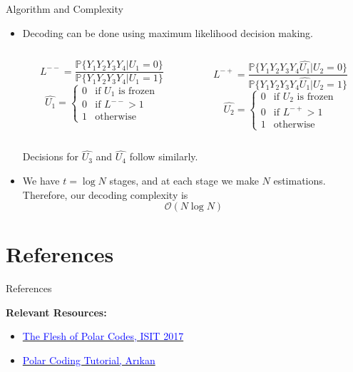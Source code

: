 \documentclass[8pt, compress]{beamer}
\begin{document}
\begin{frame}{Algorithm and Complexity}
    \begin{itemize}
        \item<1-> Decoding can be done using maximum likelihood decision making. \\
        \begin{columns}
            \begin{column}{0.5\linewidth}
            $$
            L^{--} = \frac{\mathbb{P}\{Y_1 Y_2 Y_3 Y_4 | U_1 = 0\}}{\mathbb{P}\{Y_1 Y_2 Y_3 Y_4 | U_1 = 1\}}
            $$
            $$
            \hat{U_1} = \begin{cases}
            0& \text{if } U_1 \text{ is frozen}\\
            0& \text{if } L^{--} > 1\\
            1& \text{otherwise}
            \end{cases}
            $$
            \end{column}
            \begin{column}{0.5\linewidth}
             $$
            L^{-+} = \frac{\mathbb{P}\{Y_1 Y_2 Y_3 Y_4 \hat{U_1}| U_2 = 0\}}{\mathbb{P}\{Y_1 Y_2 Y_3 Y_4 \hat{U_1}| U_2 = 1\}}
            $$
            $$
            \hat{U_2} = \begin{cases}
            0& \text{if } U_2 \text{ is frozen}\\
            0& \text{if } L^{-+} > 1\\
            1& \text{otherwise}
            \end{cases}
            $$
            \end{column}
        \end{columns}
        Decisions for $\hat{U_3}$ and $\hat{U_4}$ follow similarly.
        \item<2-> We have $t = \log N$ stages, and at each stage we make $N$ estimations. Therefore, our decoding complexity is 
        $$
        \mathcal{O}(N \log N)
        $$
    \end{itemize}
\end{frame}

\appendix
\section*{References}
\begin{frame}{References}

  
\vspace{10pt}
\textbf{Relevant Resources:}
\begin{itemize}
    \item \href{https://www.youtube.com/watch?v=VhyoZSB9g0w}{\textcolor{blue}{The Flesh of Polar Codes, ISIT 2017}} 
    \item \href{https://www.youtube.com/watch?v=PNBFUV-ZetY}{\textcolor{blue}{Polar Coding Tutorial, Arıkan}}
\end{itemize}

\end{frame}
\end{document}
